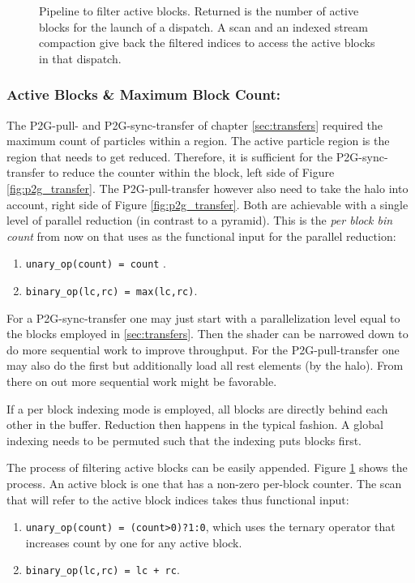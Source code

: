 \documentclass[m,times]{cgMA}
\begin{document}
\begin{figure}[!b]
  
  \caption{Pipeline to filter active blocks. Returned is the number of active blocks for the launch of a dispatch. A scan and an indexed stream compaction give back the filtered indices to access the active blocks in that dispatch.}
  \label{fig:active_block}
\end{figure}

\subsubsection{Active Blocks \& Maximum Block Count:}\label{sec:active_blocks}
The P2G-pull- and P2G-sync-transfer of chapter \ref{sec:transfers} required the maximum count of particles within a region. The active particle region is the region that needs to get reduced. Therefore, it is sufficient for the P2G-sync-transfer to reduce the counter within the block, left side of Figure \ref{fig:p2g_transfer}. The P2G-pull-transfer however also need to take the halo into account, right side of Figure \ref{fig:p2g_transfer}. Both are achievable with a single level of parallel reduction (in contrast to a pyramid). This is the \textit{per block bin count} from now on that uses as the functional input for the parallel reduction:
\begin{enumerate}
  \item \texttt{unary\_op(count) = count} .
  \item \texttt{binary\_op(lc,rc) = max(lc,rc)}.
\end{enumerate}

For a P2G-sync-transfer one may just start with a parallelization level equal to the blocks employed in \ref{sec:transfers}. Then the shader can be narrowed down to do more sequential work to improve throughput. For the P2G-pull-transfer one may also do the first but additionally load all rest elements (by the halo). From there on out more sequential work might be favorable.

If a per block indexing mode is employed, all blocks are directly behind each other in the buffer. Reduction then happens in the typical fashion. A global indexing needs to be permuted such that the indexing puts blocks first.

The process of filtering active blocks can be easily appended. Figure \ref{fig:active_block} shows the process. An active block is one that has a non-zero per-block counter. The scan that will refer to the active block indices takes thus functional input:
\begin{enumerate}
  \item \texttt{unary\_op(count) = (count>0)?1:0}, which uses the ternary operator that increases count by one for any active block.
  \item \texttt{binary\_op(lc,rc) = lc + rc}.
\end{enumerate}
\end{document}
